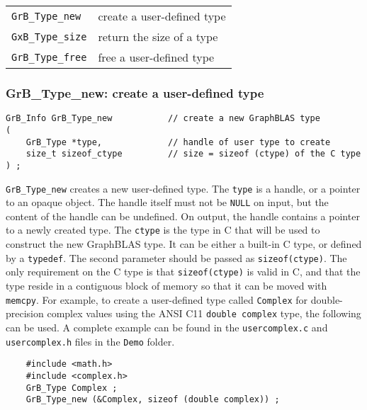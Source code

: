 \documentclass[12pt]{article}
\begin{document}
\vspace{0.2in}
{\footnotesize
\begin{tabular}{ll}
\hline
\verb'GrB_Type_new'      & create a user-defined type \\
\verb'GxB_Type_size'     & return the size of a type \\
\verb'GrB_Type_free'     & free a user-defined type \\
\hline
\end{tabular}
}
\vspace{0.2in}

\newpage
\subsubsection{{\sf GrB\_Type\_new:} create a user-defined type}
\label{type_new}

\begin{mdframed}[userdefinedwidth=6in]
{\footnotesize
\begin{verbatim}
GrB_Info GrB_Type_new           // create a new GraphBLAS type
(
    GrB_Type *type,             // handle of user type to create
    size_t sizeof_ctype         // size = sizeof (ctype) of the C type
) ;
\end{verbatim}
}\end{mdframed}

\verb'GrB_Type_new' creates a new user-defined type.  The \verb'type' is a
handle, or a pointer to an opaque object.  The handle itself must not be
\verb'NULL' on input, but the content of the handle can be undefined.  On
output, the handle contains a pointer to a newly created type.
The \verb'ctype' is the type in C that will be used to construct the new
GraphBLAS type.  It can be either a built-in C type, or defined by a
\verb'typedef'.
The second parameter should be passed as \verb'sizeof(ctype)'.  The only
requirement on the C type is that \verb'sizeof(ctype)' is valid in C, and
that the type reside in a contiguous block of memory so that it can be moved
with \verb'memcpy'.  For example, to create a user-defined type called
\verb'Complex' for double-precision complex values using the ANSI C11
\verb'double complex' type, the following can be used.  A complete example can
be found in the \verb'usercomplex.c' and \verb'usercomplex.h' files in the
\verb'Demo' folder.

    {\footnotesize
    \begin{verbatim}
    #include <math.h>
    #include <complex.h>
    GrB_Type Complex ;
    GrB_Type_new (&Complex, sizeof (double complex)) ;    \end{verbatim} }
\end{document}
